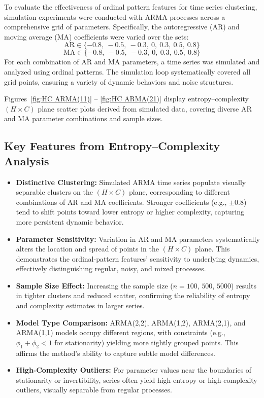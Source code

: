 \documentclass[12pt,a4paper]{article}
\begin{document}
To evaluate the effectiveness of ordinal pattern features for time series clustering, simulation experiments were conducted with ARMA processes across a comprehensive grid of parameters. Specifically, the autoregressive (AR) and moving average (MA) coefficients were varied over the sets:
\[
\text{AR} \in \{-0.8,\ -0.5,\ -0.3,\ 0,\ 0.3,\ 0.5,\ 0.8\}
\]
\[
\text{MA} \in \{-0.8,\ -0.5,\ -0.3,\ 0,\ 0.3,\ 0.5,\ 0.8\}
\]
For each combination of AR and MA parameters, a time series was simulated and analyzed using ordinal patterns. The simulation loop systematically covered all grid points, ensuring a variety of dynamic behaviors and noise structures.

Figures~\ref{fig:HC ARMA(11)} -- \ref{fig:HC ARMA(21)} display entropy–complexity $(H \times C)$ plane scatter plots derived from simulated data, covering diverse AR and MA parameter combinations and sample sizes.

\subsection{Key Features from Entropy–Complexity Analysis}

\begin{itemize}
	\item \textbf{Distinctive Clustering:} Simulated ARMA time series populate visually separable clusters on the $(H \times C)$ plane, corresponding to different combinations of AR and MA coefficients. Stronger coefficients (e.g., $\pm0.8$) tend to shift points toward lower entropy or higher complexity, capturing more persistent dynamic behavior.
	\item \textbf{Parameter Sensitivity:} Variation in AR and MA parameters systematically alters the location and spread of points in the $(H \times C)$ plane. This demonstrates the ordinal-pattern features' sensitivity to underlying dynamics, effectively distinguishing regular, noisy, and mixed processes.
	\item \textbf{Sample Size Effect:} Increasing the sample size ($n=100$, $500$, $5000$) results in tighter clusters and reduced scatter, confirming the reliability of entropy and complexity estimates in larger series.
	\item \textbf{Model Type Comparison:} ARMA(2,2), ARMA(1,2),  ARMA(2,1), and ARMA(1,1) models occupy different regions, with constraints (e.g., $\phi_1 + \phi_2 < 1$ for stationarity) yielding more tightly grouped points. This affirms the method's ability to capture subtle model differences.
	\item \textbf{High-Complexity Outliers:} For parameter values near the boundaries of stationarity or invertibility, series often yield high-entropy or high-complexity outliers, visually separable from regular processes.
\end{itemize}
\end{document}

